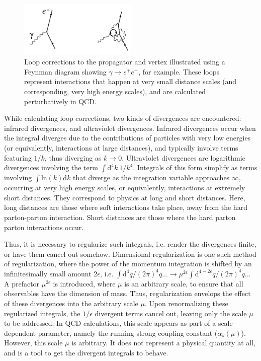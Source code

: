 \documentclass[12pt,a4paper,openright,twoside]{report}
\begin{document}
\begin{figure}[H]
\centering
\includegraphics[width=0.5\textwidth]{renormalize_diagram.png}
\caption{Loop corrections to the propagator and vertex illustrated using a Feynman diagram showing $\gamma\to e^+e^-$, for example. These loops represent interactions that happen at very small distance scales (and corresponding, very high energy scales), and are calculated perturbatively in QCD.}
\label{fig:loop_corr}
\end{figure}

While calculating loop corrections, two kinds of divergences are encountered: infrared divergences, and ultraviolet divergences. Infrared divergences occur when the integral diverges due to the contributions of particles with very low energies (or equivalently, interactions at large distances), and typically involve terms featuring $1/k$, thus diverging as $k\to 0$. Ultraviolet divergences are logarithmic divergences involving the term $\int \mathrm{d}^4k\ 1/k^4$. Integrals of this form simplify as terms involving $\int \mathrm{ln}(k) \mathrm{d}k$ that diverge as the integration variable approaches $\infty$, occurring at very high energy scales, or equivalently, interactions at extremely short distances. They correspond to physics at long and short distances. Here, long distances are those where soft interactions take place, away from the hard parton-parton interaction. Short distances are those where the hard parton parton interactions occur.

Thus, it is necessary to regularize such integrals, i.e. render the divergences finite, or have them cancel out somehow. Dimensional regularization is one such method of regularization, where the power of the momentum integration is shifted by an infinitesimally small amount $2\epsilon$, i.e. $\int \mathrm{d}^4q/(2\pi)^4 q... \to \mu^{2\epsilon}\int \mathrm{d}^{4-2\epsilon}q/(2\pi)^4 q...$ A prefactor $\mu^{2\epsilon}$ is introduced, where $\mu$ is an arbitrary scale, to ensure that all observables have the dimension of mass. Thus, regularization envelops the effect of these divergences into the arbitrary scale $\mu$. Upon renormalizing these regularized integrals, the $1/\epsilon$ divergent terms cancel out, leaving only the scale $\mu$ to be addressed. In QCD calculations, this scale appears as part of a scale dependent parameter, namely the running strong coupling constant ($\alpha_s(\mu)$). However, this scale $\mu$ is arbitrary. It does not represent a physical quantity at all, and is a tool to get the divergent integrals to behave.
\end{document}
